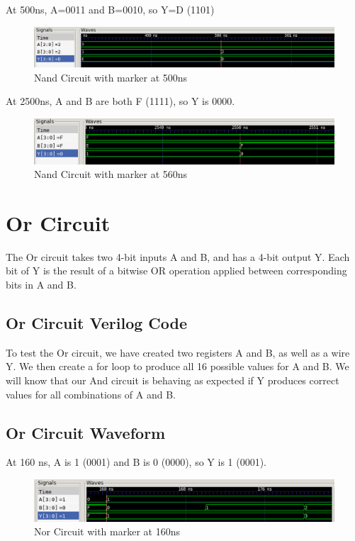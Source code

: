 \documentclass[12pt]{article}
\begin{document}
At 500ns, A=0011 and B=0010, so Y=D (1101) 
 \begin{figure}[H]
 \centering 
\includegraphics[width = 1.0\textwidth]{Nand/nand_wave1.png}
 \caption{Nand Circuit with marker at 500ns}
 \label{fig:enter-label}
 \end{figure}

At 2500ns, A and B are both F (1111), so Y is 0000. 
 \begin{figure}[H]
 \centering 
\includegraphics[width = 1.0\textwidth]{Nand/nand_wave2.png}
 \caption{Nand Circuit with marker at 560ns}
 \label{fig:enter-label}
 \end{figure}

 \section{Or Circuit}
 The Or circuit takes two 4-bit inputs A and B, and has a 4-bit output Y. Each bit of Y is the result of a bitwise OR operation applied between corresponding bits in A and B.


\subsection{Or Circuit Verilog Code}


To test the Or circuit, we have created two registers A and B, as well as a wire Y. We then create a for loop to produce all 16 possible values for A and B. We will know that our And circuit is behaving as expected if Y produces correct values for all combinations of A and B. 

\subsection{Or Circuit Waveform}

At 160 ns, A is 1 (0001) and B is 0 (0000), so Y is 1 (0001).
\begin{figure}[H]
    \centering
    \includegraphics[width = 1.0\textwidth]{Or/or_wave.PNG}
    \caption{Nor Circuit with marker at 160ns}
    \label{fig:enter-label}
\end{figure}
\end{document}
